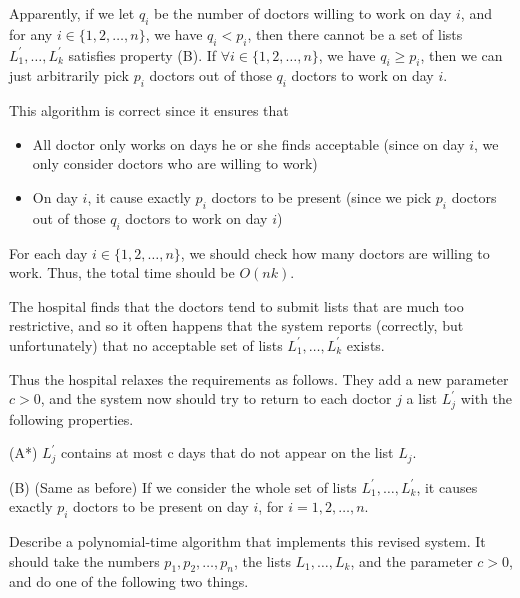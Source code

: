 Apparently, if we let $q_i$ be the number of doctors willing to work on day $i$, and for any $i \in \{1, 2, \dots, n\}$, we have $q_i < p_i$, then there cannot be a set of lists $L_{1}^{\prime}, \ldots, L_{k}^{\prime}$ satisfies property (B). If $\forall i \in \{1, 2, \dots, n\}$, we have $q_i \ge p_i$, then we can just arbitrarily pick $p_i$ doctors out of those $q_i$ doctors to work on day $i$.



This algorithm is correct since it ensures that 

\begin{itemize}
\item All doctor only works on days he or she finds acceptable (since on day $i$, we only consider doctors who are willing to work)
\item On day $i$, it cause exactly $p_i$ doctors to be present (since we pick $p_i$ doctors out of those $q_i$ doctors to work on day $i$)
\end{itemize}


For each day $i \in \{1, 2, \dots, n\}$, we should check how many doctors are willing to work. Thus, the total time should be $O(nk)$.


The hospital finds that the doctors tend to submit lists that are much too restrictive, and so it often happens that the system reports (correctly, but unfortunately) that no acceptable set of lists $L_{1}^{\prime}, \ldots, L_{k}^{\prime}$ exists.

Thus the hospital relaxes the requirements as follows. They add a new parameter $c > 0$, and the system now should try to return to each doctor $j$ a list $L_{j}^{\prime}$ with the following properties.

(A*) $L_{j}^{\prime}$ contains at most c days that do not appear on the list $L_j$.

(B) (Same as before) If we consider the whole set of lists $L_{1}^{\prime}, \ldots, L_{k}^{\prime}$, it causes exactly $p_i$ doctors to be present on day $i$, for $i = 1,2,\dots,n$.

Describe a polynomial-time algorithm that implements this revised system. It should take the numbers $p_1,p_2,\dots,p_n$, the lists $L_1,\dots,L_k$, and the parameter $c > 0$, and do one of the following two things. 

